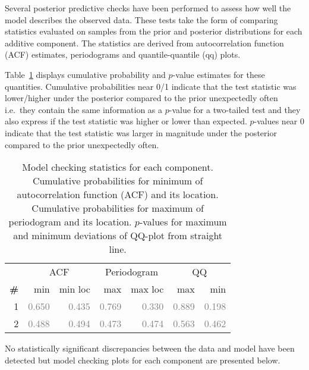 \documentclass{article} %
\def\ie{i.e.\ }
\begin{document}
Several posterior predictive checks have been performed to assess how well the model describes the observed data.
These tests take the form of comparing statistics evaluated on samples from the prior and posterior distributions for each additive component.
The statistics are derived from autocorrelation function (ACF) estimates, periodograms and quantile-quantile (qq) plots.

Table~\ref{table:check} displays cumulative probability and $p$-value estimates for these quantities.
Cumulative probabilities near 0/1 indicate that the test statistic was lower/higher under the posterior compared to the prior unexpectedly often \ie they contain the same information as a $p$-value for a two-tailed test and they also express if the test statistic was higher or lower than expected.
$p$-values near 0 indicate that the test statistic was larger in magnitude under the posterior compared to the prior unexpectedly often.

\begin{table}[htb]
\begin{center}
{\small
\begin{tabular}{|r|rr|rr|rr|}
\hline
 & \multicolumn{2}{|c|}{ACF} & \multicolumn{2}{|c|}{Periodogram} & \multicolumn{2}{|c|}{QQ} \\
\bf{\#} & {min} & {min loc} & {max} & {max loc} & {max} & {min}\\
\hline

1 & \textcolor{gray}{0.650} & \textcolor{gray}{0.435} & \textcolor{gray}{0.769} & \textcolor{gray}{0.330} & \textcolor{gray}{0.889} & \textcolor{gray}{0.198}\\

2 & \textcolor{gray}{0.488} & \textcolor{gray}{0.494} & \textcolor{gray}{0.473} & \textcolor{gray}{0.474} & \textcolor{gray}{0.563} & \textcolor{gray}{0.462}\\

\hline
\end{tabular}
\caption{
Model checking statistics for each component.
Cumulative probabilities for minimum of autocorrelation function (ACF) and its location.
Cumulative probabilities for maximum of periodogram and its location.
$p$-values for maximum and minimum deviations of QQ-plot from straight line.
}
\label{table:check}
}
\end{center}
\end{table}

No statistically significant discrepancies between the data and model have been detected but model checking plots for each component are presented below.
\end{document}
